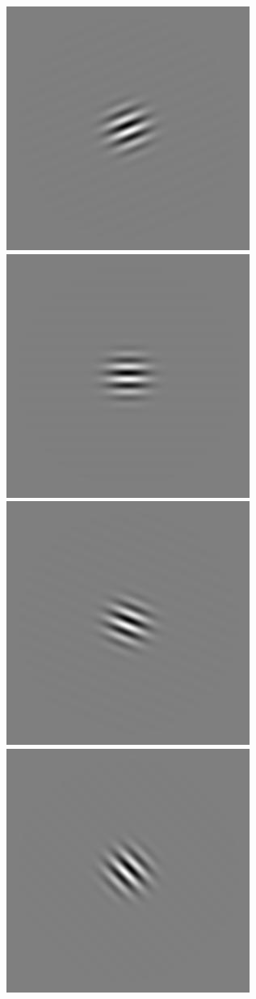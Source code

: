 \begin{figure}
\begin{center}
 \includegraphics[scale=0.1]{ch4/figures/iGabor3_3.jpg}
 \includegraphics[scale=0.1]{ch4/figures/iGabor3_4.jpg}
 \includegraphics[scale=0.1]{ch4/figures/iGabor3_5.jpg}
 \includegraphics[scale=0.1]{ch4/figures/iGabor3_6.jpg}

\end{center}
\end{figure}
